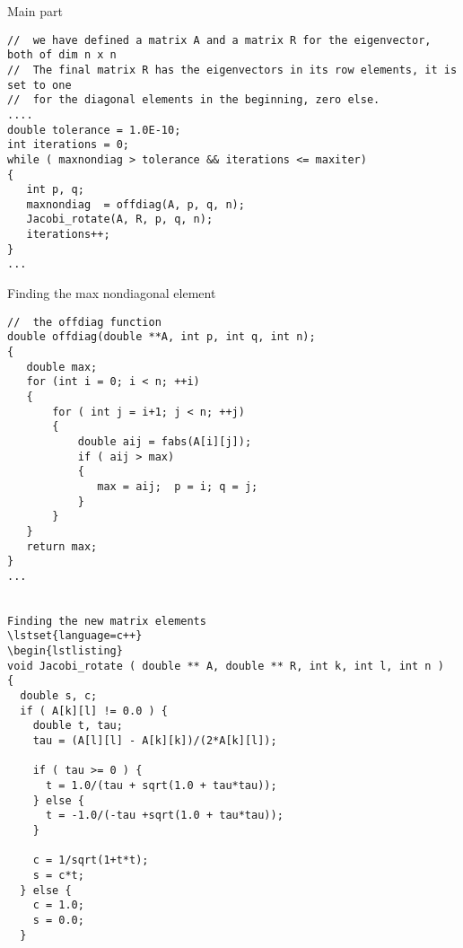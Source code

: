 Main part
\lstset{language=c++}  
\begin{lstlisting}
//  we have defined a matrix A and a matrix R for the eigenvector, both of dim n x n
//  The final matrix R has the eigenvectors in its row elements, it is set to one
//  for the diagonal elements in the beginning, zero else.
....
double tolerance = 1.0E-10; 
int iterations = 0;
while ( maxnondiag > tolerance && iterations <= maxiter)
{
   int p, q;
   maxnondiag  = offdiag(A, p, q, n);
   Jacobi_rotate(A, R, p, q, n);
   iterations++;
}
...
\end{lstlisting} 


Finding the max nondiagonal element
\lstset{language=c++}  
\begin{lstlisting}
//  the offdiag function
double offdiag(double **A, int p, int q, int n);
{
   double max;
   for (int i = 0; i < n; ++i)
   {
       for ( int j = i+1; j < n; ++j)
       {
           double aij = fabs(A[i][j]);
           if ( aij > max)
           { 
              max = aij;  p = i; q = j;
           }
       }
   }
   return max;
}
...


Finding the new matrix elements
\lstset{language=c++}  
\begin{lstlisting}
void Jacobi_rotate ( double ** A, double ** R, int k, int l, int n )
{
  double s, c;
  if ( A[k][l] != 0.0 ) {
    double t, tau;
    tau = (A[l][l] - A[k][k])/(2*A[k][l]);
    
    if ( tau >= 0 ) {
      t = 1.0/(tau + sqrt(1.0 + tau*tau));
    } else {
      t = -1.0/(-tau +sqrt(1.0 + tau*tau));
    }
    
    c = 1/sqrt(1+t*t);
    s = c*t;
  } else {
    c = 1.0;
    s = 0.0;
  }
\end{lstlisting}



